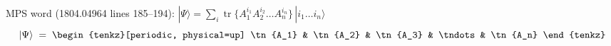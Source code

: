 \documentclass[varwidth=19cm, border=6pt]{standalone}
\begin{document}
MPS word (1804.04964 lines 185--194):
$|\Psi\rangle = \sum_i \operatorname{tr}\{A_1^{i_1} A_2^{i_2} \dots A_n^{i_n}\}\,|i_1 \dots i_n\rangle$
\[
  |\Psi\rangle \;=\;
  \begin{tenkz}[periodic, physical=up]
    \tn{A_1} & \tn{A_2} & \tn{A_3} & \tndots & \tn{A_n}
  \end{tenkz}
\]
\end{document}
